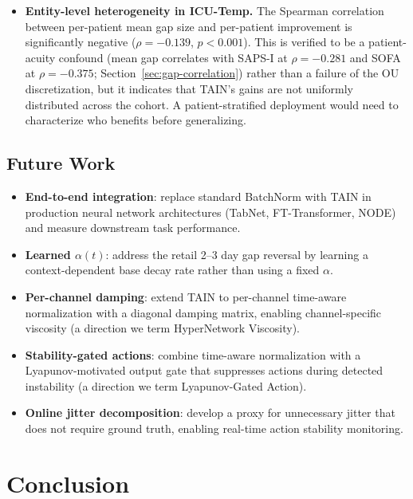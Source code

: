 \documentclass[11pt,a4paper]{article}
\begin{document}
\begin{itemize}[leftmargin=1.5em,itemsep=2pt]
    stationary signal between gaps.
  \item \textbf{Entity-level heterogeneity in ICU-Temp.} The Spearman correlation
    between per-patient mean gap size and per-patient improvement is
    significantly negative ($\rho = -0.139$, $p < 0.001$). This is verified
    to be a patient-acuity confound (mean gap correlates with SAPS-I at
    $\rho = -0.281$ and SOFA at $\rho = -0.375$; Section~\ref{sec:gap-correlation})
    rather than a failure of the OU discretization, but it indicates that
    TAIN's gains are not uniformly distributed across the cohort. A
    patient-stratified deployment would need to characterize who benefits
    before generalizing.
\end{itemize}

\subsection{Future Work}
\label{sec:futurework}

\begin{itemize}[leftmargin=1.5em,itemsep=2pt]
  \item \textbf{End-to-end integration}: replace standard BatchNorm with TAIN
    in production neural network architectures (TabNet, FT-Transformer, NODE)
    and measure downstream task performance.
  \item \textbf{Learned $\alpha(t)$}: address the retail 2--3 day gap reversal
    by learning a context-dependent base decay rate rather than using a fixed
    $\alpha$.
  \item \textbf{Per-channel damping}: extend TAIN to per-channel time-aware
    normalization with a diagonal damping matrix, enabling channel-specific
    viscosity (a direction we term HyperNetwork Viscosity).
  \item \textbf{Stability-gated actions}: combine time-aware normalization with
    a Lyapunov-motivated output gate that suppresses actions during detected
    instability (a direction we term Lyapunov-Gated Action).
  \item \textbf{Online jitter decomposition}: develop a proxy for unnecessary
    jitter that does not require ground truth, enabling real-time action
    stability monitoring.
\end{itemize}

\section{Conclusion}
\end{document}
